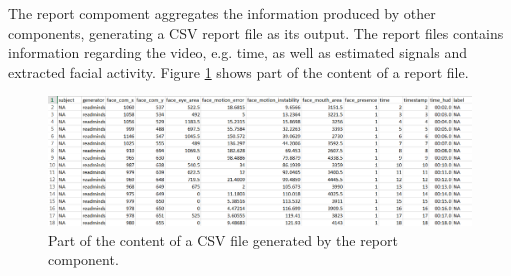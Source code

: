 The report compoment aggregates the information produced by other components, generating a CSV report file as its output. The report files contains information regarding the video, e.g. time, as well as estimated signals and extracted facial activity. Figure \ref{fig:tool-ui-report-csv} shows part of the content of a report file.

\begin{figure}[h]
    \centering
    \includegraphics[width=\textwidth]{figures/tool-ui-report-csv.png}
    \caption{Part of the content of a CSV file generated by the report component.}
    \label{fig:tool-ui-report-csv}
\end{figure}
